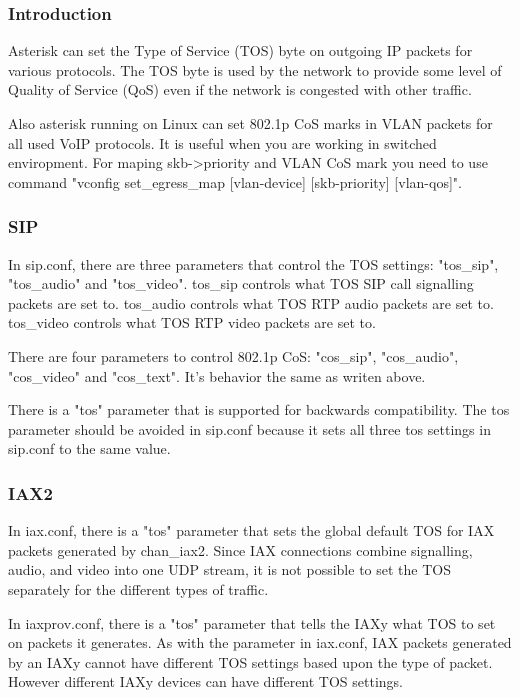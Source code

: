 \subsubsection{Introduction}

Asterisk can set the Type of Service (TOS) byte on outgoing IP packets
for various protocols.  The TOS byte is used by the network to provide
some level of Quality of Service (QoS) even if the network is
congested with other traffic. 

Also asterisk running on Linux can set 802.1p CoS marks in VLAN packets 
for all used VoIP protocols. It is useful when you are working in switched 
enviropment. For maping skb->priority and VLAN CoS mark you need to use 
command "vconfig set\_egress\_map [vlan-device] [skb-priority] [vlan-qos]".

\subsubsection{SIP}

In sip.conf, there are three parameters that control the TOS settings:
"tos\_sip", "tos\_audio" and "tos\_video". tos\_sip controls what TOS SIP 
call signalling packets are set to.  tos\_audio controls what TOS RTP audio
packets are set to.  tos\_video controls what TOS RTP video packets are
set to.  

There are four parameters to control 802.1p CoS: "cos\_sip", "cos\_audio", 
"cos\_video" and "cos\_text". It's behavior the same as writen above.

There is a "tos" parameter that is supported for backwards
compatibility.  The tos parameter should be avoided in sip.conf
because it sets all three tos settings in sip.conf to the same value.

\subsubsection{IAX2}
In iax.conf, there is a "tos" parameter that sets the global default TOS
for IAX packets generated by chan\_iax2.  Since IAX connections combine
signalling, audio, and video into one UDP stream, it is not possible
to set the TOS separately for the different types of traffic.

In iaxprov.conf, there is a "tos" parameter that tells the IAXy what TOS
to set on packets it generates.  As with the parameter in iax.conf,
IAX packets generated by an IAXy cannot have different TOS settings
based upon the type of packet.  However different IAXy devices can
have different TOS settings.

